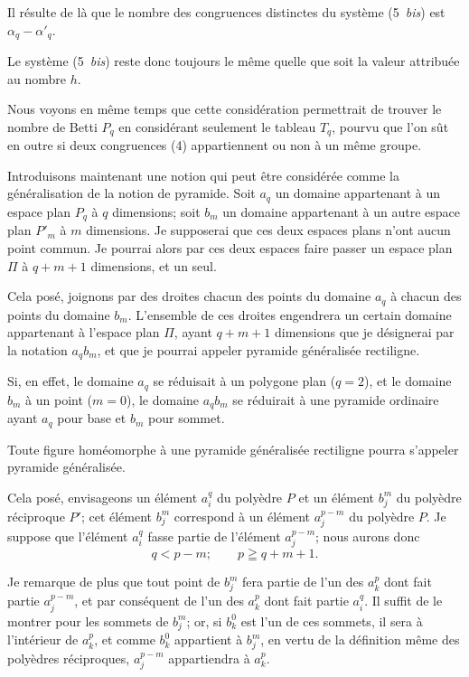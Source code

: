 \documentclass{article}
\begin{document}
Il résulte de là que le nombre des congruences distinctes du système (5~\emph{bis}) est $\alpha_{q} - \alpha'_{q}$.

Le système (5~\emph{bis}) reste donc toujours le même quelle que soit la valeur attribuée au nombre $h$.

Nous voyons en même temps que cette considération permettrait de trouver le nombre de Betti $P_{q}$ en considérant seulement le tableau $T_{q}$, pourvu que l'on sût en outre si deux congruences (4) appartiennent ou non à un même groupe.

Introduisons maintenant une notion qui peut être considérée comme la généralisation de la notion de pyramide. Soit $a_{q}$ un domaine appartenant à un espace plan $P_{q}$ à $q$ dimensions; soit $b_{m}$ un domaine appartenant à un autre espace plan $P'_{m}$ à $m$ dimensions. Je supposerai que ces deux espaces plans n'ont aucun point commun. Je pourrai alors par ces deux espaces faire passer un espace plan $\Pi$ à $q+m+1$ dimensions, et un seul.

Cela posé, joignons par des droites chacun des points du domaine $a_{q}$ à chacun des points du domaine $b_{m}$. L'ensemble de ces droites engendrera un certain domaine appartenant à l'espace plan $\Pi$, ayant $q+m+1$ dimensions que je désignerai par la notation $a_{q} b_{m}$, et que je pourrai appeler pyramide généralisée rectiligne.

Si, en effet, le domaine $a_{q}$ se réduisait à un polygone plan ($q = 2$),
et le domaine $b_{m}$ à un point ($m = 0$), le domaine $a_{q} b_{m}$ se réduirait à une pyramide ordinaire ayant $a_{q}$ pour base et $b_{m}$ pour sommet.

Toute figure homéomorphe à une pyramide généralisée rectiligne pourra s'appeler pyramide généralisée.

Cela posé, envisageons un élément $a^{q}_{i}$ du polyèdre $P$ et un élément $b^{m}_{j}$ du polyèdre réciproque $P'$; cet élément $b^{m}_{j}$ correspond à un élément $a^{p-m}_{j}$ du polyèdre $P$. Je suppose que l'élément $a^{q}_{i}$ fasse partie de l'élément $a^{p-m}_{j}$; nous aurons donc
\[ q < p-m; \qquad p \geqq q+m+1. \]

Je remarque de plus que tout point de $b^{m}_{j}$ fera partie de l'un des $a^{p}_{k}$ dont fait partie $a^{p-m}_{j}$, et par conséquent de l'un des $a^{p}_{k}$ dont fait partie $a^{q}_{i}$. Il suffit de le montrer pour les sommets de $b^{m}_{j}$; or, si $b^{0}_{k}$ est l'un de ces sommets, il sera à l'intérieur de $a^{p}_{k}$, et comme $b^{0}_{k}$ appartient à $b^{m}_{j}$, en vertu de la définition même des polyèdres réciproques, $a^{p-m}_{j}$ appartiendra à $a^{p}_{k}$.
\end{document}
